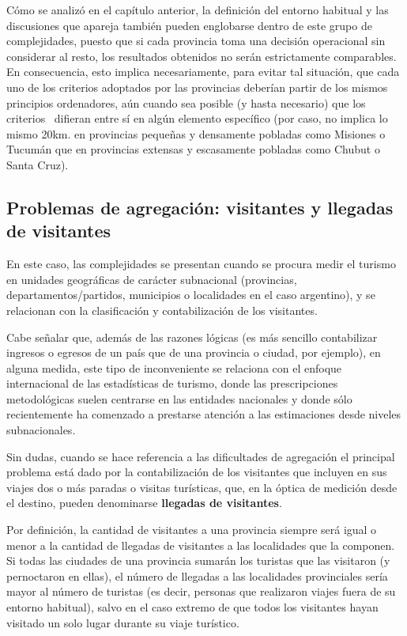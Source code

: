 \documentclass[
]{book}
\begin{document}
Cómo se analizó en el capítulo anterior, la definición del entorno habitual y las discusiones que apareja también pueden englobarse dentro de este grupo de complejidades, puesto que si cada provincia toma una decisión operacional sin considerar al resto, los resultados obtenidos no serán estrictamente comparables. En consecuencia, esto implica necesariamente, para evitar tal situación, que cada uno de los criterios adoptados por las provincias deberían partir de los mismos principios ordenadores, aún cuando sea posible (y hasta necesario) que los criterios~ difieran entre sí en algún elemento específico (por caso, no implica lo mismo 20km. en provincias pequeñas y densamente pobladas como Misiones o Tucumán que en provincias extensas y escasamente pobladas como Chubut o Santa Cruz).

\hypertarget{problemas-de-agregaciuxf3n-visitantes-y-llegadas-de-visitantes}{%
\subsection{Problemas de agregación: visitantes y llegadas de visitantes}\label{problemas-de-agregaciuxf3n-visitantes-y-llegadas-de-visitantes}}

En este caso, las complejidades se presentan cuando se procura medir el turismo en unidades geográficas de carácter subnacional (provincias, departamentos/partidos, municipios o localidades en el caso argentino), y se relacionan con la clasificación y contabilización de los visitantes.

Cabe señalar que, además de las razones lógicas (es más sencillo contabilizar ingresos o egresos de un país que de una provincia o ciudad, por ejemplo), en alguna medida, este tipo de inconveniente se relaciona con el enfoque internacional de las estadísticas de turismo, donde las prescripciones metodológicas suelen centrarse en las entidades nacionales y donde sólo recientemente ha comenzado a prestarse atención a las estimaciones desde niveles subnacionales.

Sin dudas, cuando se hace referencia a las dificultades de agregación el principal problema está dado por la contabilización de los visitantes que incluyen en sus viajes dos o más paradas o visitas turísticas, que, en la óptica de medición desde el destino, pueden denominarse \textbf{llegadas de visitantes}.

Por definición, la cantidad de visitantes a una provincia siempre será igual o menor a la cantidad de llegadas de visitantes a las localidades que la componen. Si todas las ciudades de una provincia sumarán los turistas que las visitaron (y pernoctaron en ellas), el número de llegadas a las localidades provinciales sería mayor al número de turistas (es decir, personas que realizaron viajes fuera de su entorno habitual), salvo en el caso extremo de que todos los visitantes hayan visitado un solo lugar durante su viaje turístico.
\end{document}
